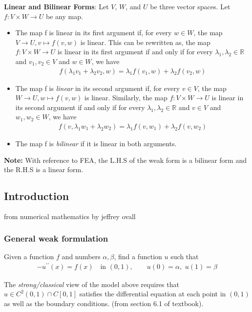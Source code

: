 \documentclass[../main.tex]{subfiles}
\begin{document}
\textbf{Linear and Bilinear Forms}:
Let $V$, $W$, and $U$ be three vector spaces. Let $f: V \times W \to U$ be any map.
\begin{itemize}
    \item The map f is linear in its first argument if, for every $w \in W$, the map $V \to U, v \mapsto f(v, w)$ is linear. This can be rewritten as, the map $f : V \times W \to U$ is linear in its first argument if and only if for every $\lambda_1, \lambda_2 \in \mathbb{R}$ and $v_1, v_2 \in V$ and $w \in W$, we have
    \begin{align*}
        f(\lambda_1 v_1 + \lambda_2 v_2, w) = \lambda_1 f(v_1, w) + \lambda_2 f(v_2, w)
    \end{align*}
    \item The map f is \textit{linear} in its second argument if, for every $v \in V$, the map $W \to U, w \mapsto f(v, w)$ is linear. Similarly, the map $f : V \times W \to U$ is linear in its second argument if and only if for every $\lambda_1, \lambda_2 \in \mathbb{R}$ and $v \in V$ and $w_1, w_2 \in W$, we have
    \begin{align*}
        f(v, \lambda_1 w_1 + \lambda_2 w_2) = \lambda_1 f(v, w_1) + \lambda_2 f(v, w_2)
    \end{align*}
    \item The map f is \textit{bilinear} if it is linear in both arguments.
\end{itemize}

\noindent\textbf{Note:} With reference to FEA, the L.H.S of the weak form is a bilinear form and the R.H.S is a linear form.

\subsection{Introduction}
from numerical mathematics by jeffrey ovall \\

\subsubsection{General weak formulation}


Given a function $f$ and numbers $\alpha, \beta$, find a function $u$ such that
\begin{align}
-u^{\prime\prime}(x) = f(x) \quad \text{in } (0,1), \quad\quad u(0) = \alpha, \,\, u(1) = \beta \label{eq:classical-form-bvp}
\end{align}

The \textit{strong/classical} view of the model above requires that $u \in C^2(0,1) \cap C[0,1]$ satisfies the differential equation at each point in $(0,1)$ as well as the boundary conditions. (from section 6.1 of textbook).
\end{document}
